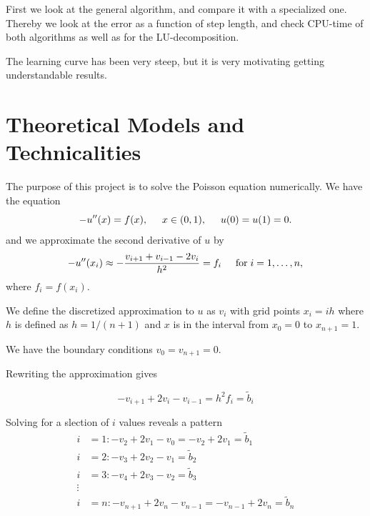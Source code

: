 \documentclass[%
oneside,                 %
final,                   %
10pt]{article}
\begin{document}
First we look at the general algorithm, and compare it with a specialized one. Thereby we look at the error as a function of step length, and check CPU-time of both algorithms as well as for the LU-decomposition.

The learning curve has been very steep, but it is very motivating getting understandable results.


\section{Theoretical Models and Technicalities}

The purpose of this project is to solve the Poisson equation numerically. We have the equation
\begin{equation*}
-u''(x) = f(x), \hspace{0.5cm} x\in(0,1), \hspace{0.5cm} u(0) = u(1) = 0.
\end{equation*}
and we approximate the second derivative of $u$ by
\begin{equation*}
-u''(x_i)\approx -\frac{v_{i+1}+v_{i-1}-2v_i}{h^2} = f_i  \hspace{0.5cm} \mathrm{for} \hspace{0.1cm} i=1,\dots, n,
\end{equation*}
where $f_i=f(x_i)$.



We define the discretized approximation  to $u$ as $v_i$  with
grid points $x_i=ih$ where $h$ is defined as $h=1/(n+1)$ and $x$ is in the interval from $x_0=0$ to $x_{n+1}=1$.

We have the boundary conditions $v_0 = v_{n+1} = 0$.


Rewriting the approximation gives

\begin{equation*}
-v_{i+1}+2v_{i}-v_{i-1} = h^2f_i=\tilde{b}_i
\end{equation*}


Solving for a slection of $i$ values reveals a pattern\\
\begin{align*}
  i &=1: -v_{2}+2v_{1}-v_0 = -v_{2}+2v_1=\tilde{b}_1\\
  i &=2: -v_{3}+2v_{2}-v_1 = \tilde{b}_2\\
  i &=3: -v_{4}+2v_{3}-v_2 = \tilde{b}_3\\
  \vdots\\
  i &=n: -v_{n+1}+2v_n-v_{n-1} = -v_{n-1}+2v_{n}=\tilde{b}_n\\
\end{align*}
\end{document}
